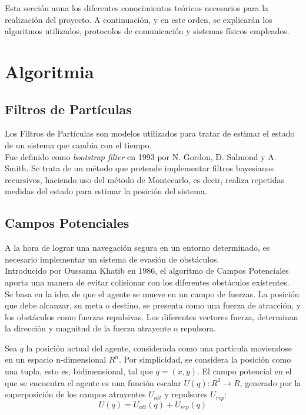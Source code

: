 

Esta sección auna los diferentes conocimientos teóricos necesarios para la realización del proyecto. A continuación, y en este orden, se explicarán los algoritmos utilizados, protocolos de comunicación y sistemas físicos empleados.

\section{Algoritmia}


\subsection{Filtros de Partículas}

Los Filtros de Partículas son modelos utilizados para tratar de estimar el estado de un sistema que cambia con el tiempo. 
\\Fue definido como \textit{bootstrap filter} en 1993 por N. Gordon, D. Salmond y A. Smith.  Se trata de un método que pretende implementar filtros bayesianos recursivos, haciendo uso del método de Montecarlo, es decir, realiza repetidas medidas del estado para estimar la posición del sistema.
\\ 

\subsection{Campos Potenciales}
\label{subsec:PF}
\setcounter{equation}{0}
A la hora de lograr una navegación segura en un entorno determinado, es necesario implementar un sistema de evasión de obstáculos. 
\\Introducido por Oussama Khatib en 1986, el algoritmo de Campos Potenciales aporta una manera de evitar colisionar con los diferentes obstáculos existentes.\\ Se basa en la idea de que el agente se mueve en un campo de fuerzas. 
La posición que debe alcanzar, su meta o destino, se presenta como una fuerza de atracción, y los obstáculos como fuerzas repulsivas. 
Los diferentes vectores fuerza, determinan la dirección y magnitud de la fuerza atrayente o repulsora.

Sea $q$ la posición actual del agente, considerada como una partícula moviendose en un espacio n-dimensional $R^n$. Por simplicidad, se considera la posición como una tupla, esto es, bidimensional, tal que $q = (x,y)$. El campo potencial en el que se encuentra el agente es una función escalar $ U(q):R^2\rightarrow R $, generado por la superposición de los campos atrayentes $U_{att}$ y repulsores $U_{rep}$:
\begin{equation}
U(q) = U_{att}(q) + U_{rep}(q)
\label{equation:Uq}
\end{equation}

